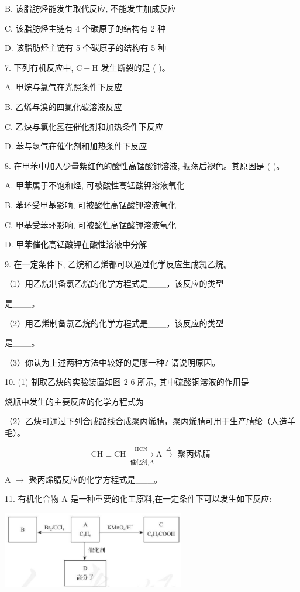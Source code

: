 \documentclass[10pt]{article}
\begin{document}
B. 该脂肪烃能发生取代反应, 不能发生加成反应

C. 该脂肪烃主链有 4 个碳原子的结构有 2 种

D. 该脂肪烃主链有 5 个碳原子的结构有 5 种

7. 下列有机反应中, \(\mathrm{C} - \mathrm{H}\) 发生断裂的是 ( )。

A. 甲烷与氯气在光照条件下反应

B. 乙烯与溴的四氯化碳溶液反应

C. 乙炔与氯化氢在催化剂和加热条件下反应

D. 苯与氢气在催化剂和加热条件下反应

8. 在甲苯中加入少量紫红色的酸性高锰酸钾溶液, 振荡后褪色。其原因是 ( )。

A. 甲苯属于不饱和烃, 可被酸性高锰酸钾溶液氧化

B. 苯环受甲基影响, 可被酸性高锰酸钾溶液氧化

C. 甲基受苯环影响, 可被酸性高锰酸钾溶液氧化

D. 甲苯催化高锰酸钾在酸性溶液中分解

9. 在一定条件下, 乙烷和乙烯都可以通过化学反应生成氯乙烷。

（1）用乙烷制备氯乙烷的化学方程式是\_\_\_，该反应的类型

是\_\_\_。

（2）用乙烯制备氯乙烷的化学方程式是\_\_\_，该反应的类型

是\_\_\_。

（3）你认为上述两种方法中较好的是哪一种? 请说明原因。

10. (1) 制取乙炔的实验装置如图 2-6 所示, 其中硫酸铜溶液的作用是\_\_\_

烧瓶中发生的主要反应的化学方程式为

（2）乙炔可通过下列合成路线合成聚丙烯腈，聚丙烯腈可用于生产腈纶（人造羊毛）。

\[
\mathrm{{CH}} \equiv \mathrm{{CH}}\xrightarrow[{\text{ 催化剂,}\Delta }]{\mathrm{{HCN}}}\mathrm{A}\xrightarrow[]{\Delta }\text{ 聚丙烯腈 }
\]

A \(\rightarrow\) 聚丙烯腈反应的化学方程式是\_\_\_。

11. 有机化合物 \(\mathrm{A}\) 是一种重要的化工原料,在一定条件下可以发生如下反应:

\begin{center}
\includegraphics[max width=0.6\textwidth]{images/0190efc5-b58a-7c43-bfb0-e0a030df9cfd_57_753715.jpg}
\end{center}
\end{document}
